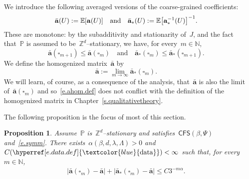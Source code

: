 \documentclass[11pt,twoside]{article} %
\let\oldsquare\square %
\renewcommand{\square}{\oldsquare}
\numberwithin{equation}{section}
\newtheorem{proposition}[theorem]{Proposition}
\theoremstyle{definition}
\newcommand{\dataref}{\hyperref[e.data.def]{\textcolor{blue}{\ensuremath{\mathrm{data}}}}}
\let\originalleft\left
\let\originalright\right
\renewcommand{\left}{\mathopen{}\mathclose\bgroup\originalleft}
\renewcommand{\right}{\aftergroup\egroup\originalright}
\newcommand*{\N}{\ensuremath{\mathbb{N}}}
\newcommand*{\Zd}{\ensuremath{\mathbb{Z}^d}}
\renewcommand{\a}{\mathbf{a}}
\newcommand{\ahom}{\bar{\a}}
\newcommand{\cu}{\square}
\renewcommand{\P}{\mathbb{P}}
\newcommand{\E}{\mathbb{E}}
\newcommand{\CFS}{\mathsf{CFS}}
\begin{document}
We introduce the following averaged versions of the coarse-grained coefficients:
\begin{equation}
\label{e.ahomahoms}
\ahom(U):= \E\left[ \a(U)\right] 
\quad \mbox{and} \quad 
\ahom_*(U):= \E\left[ \a_*^{-1}(U)\right]^{-1}.
\end{equation}
These are monotone: by the subadditivity and stationarity of~$J$, and the fact that~$\P$ is assumed to be~$\Zd$--stationary, we have, for every~$m\in \N$,
\begin{equation}
\label{e.matrix.subadd}
\ahom(\cu_{m+1}) \leq  \ahom(\cu_m) 
\quad \mbox{and} \quad 
\ahom_*(\cu_{m}) \leq  \ahom_*(\cu_{m+1}).
\end{equation}
We define the homogenized matrix~$\ahom$ by 
\begin{equation}
\label{e.ahom.def}
\ahom := \lim_{m\to \infty} \ahom_*(\cu_m). 
\end{equation}
We will learn, of course, as a consequence of the analysis, that~$\ahom$ is also the limit of~$\ahom(\cu_m)$ and so~\eqref{e.ahom.def} does not conflict with the definition of the homogenized matrix in Chapter~\ref{s.qualitativetheory}. 

\smallskip

The following proposition is the focus of most of this section. 

\begin{proposition}
\label{p.algebraicrate.E}
Assume~$\P$ is~$\Zd$--stationary and satisfies~$\CFS(\beta,\Psi)$ and~\eqref{e.symm}.
There exists~$\alpha(\beta,d,\lambda,\Lambda) >0$ and~$C(\dataref)<\infty$
such that, for every~$m\in\N$,  
\begin{align}
\label{e.EJtozero.rate}
\bigl| \ahom(\cu_m) - \ahom \bigr|
+
\bigl| \ahom_*(\cu_m) - \ahom \bigr|
\leq 
C3^{-m\alpha}. 
\end{align}
\end{proposition}
\end{document}
